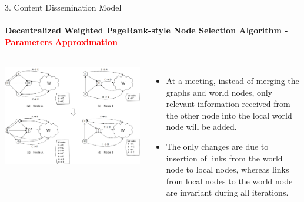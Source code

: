 \documentclass{beamer}		%
\begin{document}
\begin{frame}{3. Content Dissemination Model}
\framesubtitle{Decentralized Weighted PageRank-style Node Selection Algorithm - \textcolor{red}{Parameters Approximation}}
\begin{columns}
\includegraphics[scale=0.048]{imgs/Fig3.png}
\begin{itemize}
    \item At a meeting, instead of merging the graphs and world nodes, only relevant information received from the other node into the local world node will be added. 
    \item The only changes are due to insertion of links from the world node to local nodes, whereas links from local nodes to the world node are invariant during all iterations.
\end{itemize}
\end{columns}
\end{frame}
\end{document}
